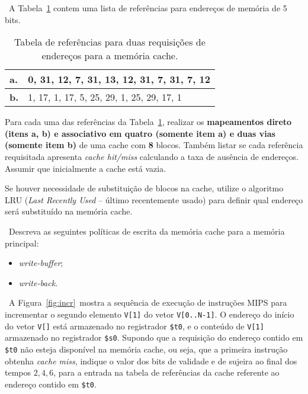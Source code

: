 

\exercise~A Tabela~\ref{tab:refs} contem uma lista de
referências para endereços de memória de 5 bits.

\begin{table}[h]
\centering
\begin{tabular}{|l|l|}\hline
  \bf a. & 0, 31, 12, 7, 31, 13, 12, 31, 7, 31, 7, 12 \\\hline
  \bf b. & 1, 17, 1, 17, 5, 25, 29, 1, 25, 29, 17, 1 \\\hline
\end{tabular}
\caption{Tabela de referências para duas requisições de endereços para
  a memória cache.}
\label{tab:refs}
\end{table}

Para cada uma das referências da Tabela~\ref{tab:refs}, realizar os
{\bf mapeamentos direto (itens a, b) e associativo em quatro (somente
item a) e duas vias (somente item b)} de uma cache com {\bf 8}
blocos. Também listar se cada referência requisitada apresenta {\it
cache hit/miss\/} calculando a taxa de ausência de endereços. Assumir
que inicialmente a cache está vazia.

Se houver necessidade de substituição de blocos na cache, utilize o
algoritmo LRU ({\em Last Recently Used} -- último recentemente usado)
para definir qual endereço será substituído na memória cache.

\exercise~Descreva as seguintes políticas de escrita da memória cache
para a memória principal:

\begin{itemize}
\item {\em write-buffer};
\item {\em write-back}.
\end{itemize}

 \exercise~A Figura~\ref{fig:incr}~mostra a
sequência de execução de instruções MIPS para incrementar o segundo
elemento {\tt V[1]} do vetor {\tt V[0..N-1]}. O endereço do início do
vetor {\tt V[]} está armazenado no registrador {\tt \$t0}, e o
conteúdo de {\tt V[1]} armazenado no registrador {\tt \$s0}. Supondo
que a requisição do endereço contido em {\tt \$t0} não esteja
disponível na memória cache, ou seja, que a primeira instrução obtenha
{\em cache miss}, indique o valor dos bits de validade e de sujeira ao
final dos tempos $2, 4, 6$, para a entrada na tabela de referências da
cache referente ao endereço contido em {\tt \$t0}.

